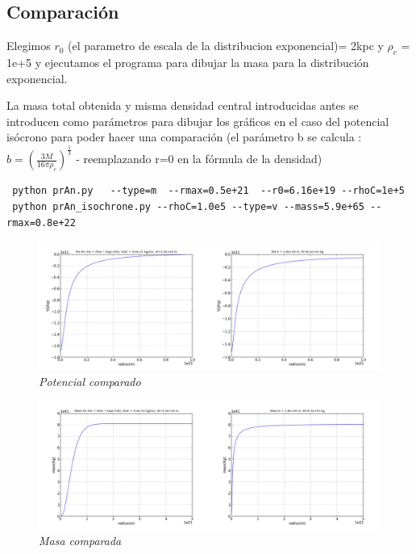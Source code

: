 \documentclass[12pt]{book}
\begin{document}
\subsection*{Comparación}
\begin{description}
\item Elegimos $r_0$ (el parametro de escala de la distribucion exponencial)= 2kpc y $\rho_c$ = 1e+5 y ejecutamos el programa para dibujar la masa para la distribución exponencial. 
\item La masa total obtenida y misma densidad central introducidas antes se introducen como parámetros para dibujar los gráficos en el caso del potencial isócrono para poder hacer una comparación (el parámetro b se calcula : $b = (\frac{3 M}{16 \pi \rho_c})^{\frac{1}{3}}$ -  reemplazando r=0 en la fórmula de la densidad)

\begin{verbatim}
 python prAn.py   --type=m  --rmax=0.5e+21  --r0=6.16e+19 --rhoC=1e+5
 python prAn_isochrone.py --rhoC=1.0e5 --type=v --mass=5.9e+65 --rmax=0.8e+22
\end{verbatim}

\item 
\begin{figure}[!ht]
 \centering
 \includegraphics[scale=0.3]{potAnComp.png}
 \caption{\emph{Potencial comparado}}
\end{figure}

\item 
\begin{figure}[!ht]
 \centering
 \includegraphics[scale=0.3]{massAnComp.png}
 \caption{\emph{Masa comparada}}
\end{figure}



\end{description}
\end{document}
